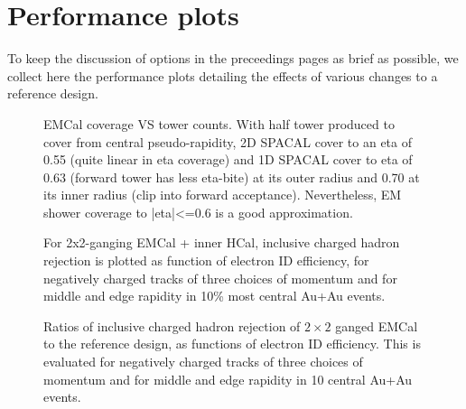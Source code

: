 
\chapter*{Performance plots}
\label{cha:performance-plots}

To keep the discussion of options in the preceedings pages as brief as
possible, we collect here the performance plots detailing the effects
of various changes to a reference design.

\begin{figure}[hbt]
  \centering
  \caption{EMCal coverage VS tower counts. With half tower produced to cover from central pseudo-rapidity, 2D SPACAL cover to an eta of 0.55 (quite linear in eta coverage) and 1D SPACAL cover to eta of 0.63 (forward tower has less eta-bite) at its outer radius and 0.70 at its inner radius (clip into forward acceptance). Nevertheless, EM shower coverage to |eta|<=0.6 is a good approximation.}
  \label{fig:eta_tower_fraction}
\end{figure}

\begin{figure}[hbt]
  \centering
  \caption{For 2x2-ganging EMCal + inner HCal, inclusive charged
    hadron rejection is plotted as function of electron ID efficiency,
    for negatively charged tracks of three choices of momentum and for
    middle and edge rapidity in 10\% most central Au+Au events.}
  \label{fig:eid_auau}
\end{figure}

\begin{figure}[hbt]
  \centering

  \caption{ Ratios of inclusive charged hadron rejection of $2\times2$ ganged
 EMCal to the reference design, as functions of electron ID
 efficiency. This is evaluated for negatively charged tracks of three
 choices of momentum and for middle and edge rapidity in 10%
 central Au+Au events.}
\label{fig:eid_ratios_auau}
\end{figure}